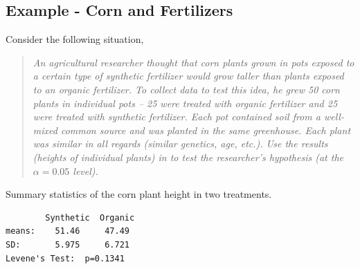 \documentclass[10pt,openany]{book}\usepackage[]{graphicx}\usepackage[]{color}
\begin{document}

\newpage
\subsection{Example - Corn and Fertilizers}
\vspace{-12pt}
Consider the following situation,
\vspace{-12pt}
\begin{quote}
\textsl{An agricultural researcher thought that corn plants grown in pots exposed to a certain type of synthetic fertilizer would grow taller than plants exposed to an organic fertilizer.  To collect data to test this idea, he grew 50 corn plants in individual pots -- 25 were treated with organic fertilizer and 25 were treated with synthetic fertilizer.  Each pot contained soil from a well-mixed common source and was planted in the same greenhouse.  Each plant was similar in all regards (similar genetics, age, etc.).  Use the results (heights of individual plants) in  to test the researcher's hypothesis (at the $\alpha=0.05$ level).}
\end{quote}

\vspace{-12pt}
\begin{table}[htbp]
  \caption{Summary statistics of the corn plant height in two treatments.}
  \label{tab:CornFert}
  \begin{center}
    \begin{minipage}{3in}
      \begin{Verbatim}
        Synthetic  Organic
means:    51.46     47.49
SD:       5.975     6.721
Levene's Test:  p=0.1341
      \end{Verbatim}
    \end{minipage}
  \end{center}
\end{table}
\end{document}
